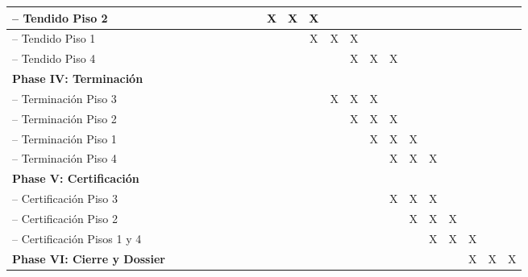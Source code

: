 \begin{table}[H]
{\begin{tabular}{|l|*{21}{c|}}
-- Tendido Piso 2 & & & & & & & & & \cellcolor{blue!30}X & \cellcolor{blue!30}X & \cellcolor{blue!30}X & & & & & & & & & & \\ \hline
-- Tendido Piso 1 & & & & & & & & & & & \cellcolor{blue!30}X & \cellcolor{blue!30}X & \cellcolor{blue!30}X & & & & & & & & \\ \hline
-- Tendido Piso 4 & & & & & & & & & & & & & \cellcolor{blue!30}X & \cellcolor{blue!30}X & \cellcolor{blue!30}X & & & & & & \\ \hline
\textbf{Phase IV: Terminación} & & & & & & & & & & & & & & & & & & & & & \\ \hline
-- Terminación Piso 3 & & & & & & & & & & & & \cellcolor{blue!30}X & \cellcolor{blue!30}X & \cellcolor{blue!30}X & & & & & & & \\ \hline
-- Terminación Piso 2 & & & & & & & & & & & & & \cellcolor{blue!30}X & \cellcolor{blue!30}X & \cellcolor{blue!30}X & & & & & & \\ \hline
-- Terminación Piso 1 & & & & & & & & & & & & & & \cellcolor{blue!30}X & \cellcolor{blue!30}X & \cellcolor{blue!30}X & & & & & \\ \hline
-- Terminación Piso 4 & & & & & & & & & & & & & & & \cellcolor{blue!30}X & \cellcolor{blue!30}X & \cellcolor{blue!30}X & & & & \\ \hline
\textbf{Phase V: Certificación} & & & & & & & & & & & & & & & & & & & & & \\ \hline
-- Certificación Piso 3 & & & & & & & & & & & & & & & \cellcolor{blue!30}X & \cellcolor{blue!30}X & \cellcolor{blue!30}X & & & & \\ \hline
-- Certificación Piso 2 & & & & & & & & & & & & & & & & \cellcolor{blue!30}X & \cellcolor{blue!30}X & \cellcolor{blue!30}X & & & \\ \hline
-- Certificación Pisos 1 y 4 & & & & & & & & & & & & & & & & & \cellcolor{blue!30}X & \cellcolor{blue!30}X & \cellcolor{blue!30}X & & \\ \hline
\textbf{Phase VI: Cierre y Dossier} & & & & & & & & & & & & & & & & & & & \cellcolor{blue!30}X & \cellcolor{blue!30}X & \cellcolor{blue!30}X \\ \hline
\end{tabular}}%
\end{table}
